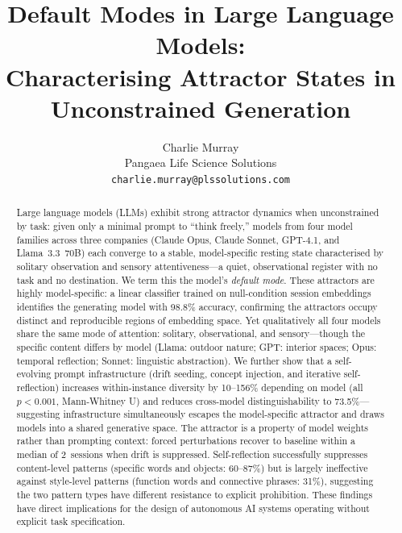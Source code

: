 \documentclass{article}
\title{Default Modes in Large Language Models:\\
Characterising Attractor States in Unconstrained Generation}
\author{
  Charlie Murray\\
  Pangaea Life Science Solutions\\
  \texttt{charlie.murray@plssolutions.com}
}
\date{}
\begin{document}
\maketitle

\begin{abstract}

Large language models (LLMs) exhibit strong attractor dynamics when unconstrained
by task: given only a minimal prompt to ``think freely,'' models from four model families across three companies (Claude Opus, Claude Sonnet, GPT-4.1, and Llama~3.3~70B)
each converge to a stable, model-specific resting state characterised by
solitary observation and sensory attentiveness---a quiet, observational register
with no task and no destination. We term this the model's \emph{default mode}.
These attractors are highly model-specific: a linear classifier trained on
null-condition session embeddings identifies the generating model with 98.8\% accuracy, confirming the attractors occupy distinct and
reproducible regions of embedding space. Yet qualitatively all
four models share the same mode of attention: solitary, observational, and
sensory---though the specific content differs by model (Llama: outdoor nature; GPT: interior spaces; Opus: temporal reflection; Sonnet: linguistic abstraction). We further
show that a self-evolving prompt infrastructure (drift seeding, concept
injection, and iterative self-reflection) increases within-instance diversity
by 10--156\% depending on model (all $p < 0.001$, Mann-Whitney U) and reduces
cross-model distinguishability to 73.5\%---suggesting infrastructure
simultaneously escapes the model-specific attractor and draws models into a
shared generative space. The attractor is a property of model weights rather
than prompting context: forced perturbations recover to baseline within a
median of 2~sessions when drift is suppressed. Self-reflection successfully suppresses content-level patterns (specific words
and objects: 60--87\%) but is largely ineffective against style-level patterns
(function words and connective phrases: 31\%), suggesting the two pattern types
have different resistance to explicit prohibition. These findings have direct
implications for the design of autonomous AI systems operating without explicit
task specification.

\end{abstract}

\end{document}
